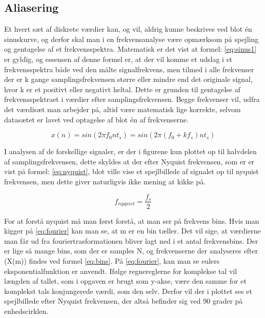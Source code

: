 \subsection{Aliasering}
Et hvert sæt af diskrete værdier kan, og vil, aldrig kunne beskrives ved blot én sinuskurve, og derfor skal man i en frekvensanalyse være opmærksom på spejling og gentagelse af et frekvensspektra. Matematisk er det vist at formel: \eqref{eq:sinus1} er gyldig, og essensen af denne formel er, at der vil komme et udslag i et frekvensspektra både ved den målte signalfrekvens, men tilmed i alle frekvenser der er k gange samplingsfrekvensen større eller mindre end det originale signal, hvor k er et positivt eller negativt heltal. Dette er grunden til gentagelse af frekvensspektraet i værdier efter samplingsfrekvensen. Begge frekvenser vil, udfra det værdisæt man arbejder på, altid være matematisk lige korrekte, selvom datasætet er lavet ved optagelse af blot én af frekvenserne.

\begin{equation}\label{eq:sinus1}
{x(n)} = sin(2\pi f_0 n t_s) =sin(2\pi (f_0+kf_s) n t_s) 
\end{equation}

  
I analysen af de forskellige signaler, er der i figurene kun plottet op til halvdelen af samplingsfrekvensen, dette skyldes at der efter Nyquist frekvensen, som er er vist på formel: \eqref{eq:nyquist}, blot ville vise et spejlbillede af signalet op til nyquist frekvensen, men dette giver naturligvis ikke mening at kikke på.
 
  \begin{equation}\label{eq:nyquist}
  f_{nyquist} = \frac{f_s}{2} 
  \end{equation}

For at forstå nyquist må man først forstå, at man ser på frekvens bins. Hvis man kigger på \eqref{eq:fourier} kan man se, at m er en bin tæller. Det vil sige, at værdierne man får ud fra fouriertrasformationen bliver lagt ned i et antal frekvensbins. Der er lige så mange bins, som der er samples N, og frekvenserne der analyseres efter (X(m)) findes ved formel \eqref{eq:bins}. På \eqref{eq:fourier}, kan man se eulers eksponentialfunktion er anvendt. Ifølge regnereglerne for komplekse tal vil længden af tallet, som i opgaven er brugt som y-akse, være den samme for et komplekst tals konjungerede værdi, som den selv. Derfor vil der i plottet ses et spejlbillede efter Nyquist frekvensen, der altså befinder sig ved 90 grader på enhedscirklen.  
 
